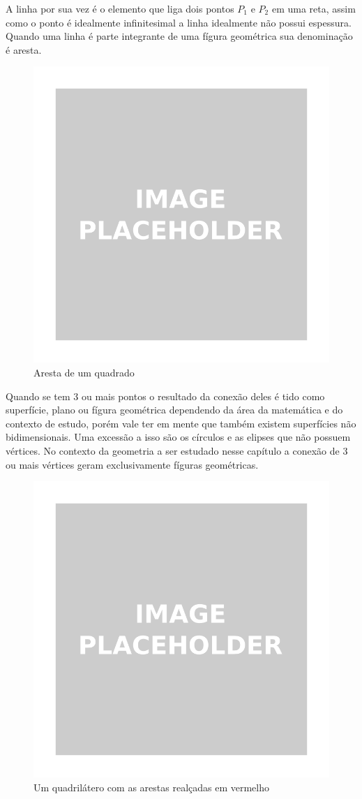 \begin{multicols*}{2}
    A linha por sua vez é o elemento que liga dois pontos $P_1$ e $P_2$ em uma reta, assim como o ponto é idealmente 
    infinitesimal a linha idealmente não possui espessura. Quando uma linha é parte integrante de uma fígura geométrica 
    sua denominação é aresta.

    \begin{figure}[H]
        \centering
        \includegraphics[width=0.7\columnwidth]{assets/image_placeholder.png}
        \caption{Aresta de um quadrado}
    \end{figure}


    Quando se tem 3 ou mais pontos o resultado da conexão deles é tido como superfície, plano ou fígura geométrica 
    dependendo da área da matemática e do contexto de estudo, porém vale ter em mente que também existem superfícies 
    não bidimensionais. Uma excessão a isso são os círculos e as elipses que não possuem vértices. No contexto da 
    geometria a ser estudado nesse capítulo a conexão de 3 ou mais vértices geram exclusivamente fíguras geométricas. 

    \begin{figure}[H]
        \centering
        \includegraphics[width=0.7\columnwidth]{assets/image_placeholder.png}
        \caption{Um quadrilátero com as arestas realçadas em vermelho}
    \end{figure}


\end{multicols*}
